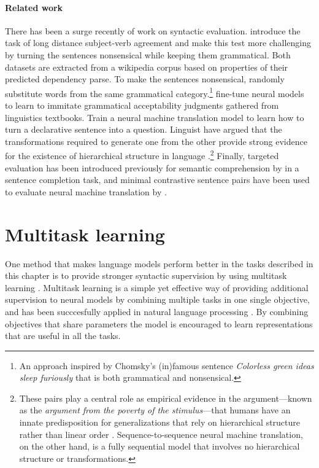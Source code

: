 \paragraph{Related work} There has been a surge recently of work on syntactic evaluation. \citet{linzen2016syntax} introduce the task of long distance subject-verb agreement and \citet{gulordava2018colorless} make this test more challenging by turning the sentences nonsensical while keeping them grammatical. Both datasets are extracted from a wikipedia corpus based on properties of their predicted dependency parse. To make the sentences nonsensical, \citet{gulordava2018colorless} randomly substitute words from the same grammatical category.\footnote{An approach inspired by Chomsky's (in)famous sentence \textit{Colorless green ideas sleep furiously} that is both grammatical and nonsensical.} \citet{warstadt2018acceptability} fine-tune neural models to learn to immitate grammatical acceptability judgments gathered from linguistics textbooks.
\citet{mccoy2018revisiting} Train a neural machine translation model to learn how to turn a declarative sentence into a question. Linguist have argued that the transformations required to generate one from the other provide strong evidence for the existence of hierarchical structure in language \cite{everaert2015structures}.\footnote{These pairs play a central role as empirical evidence in the argument---known as the \textit{argument from the poverty of the stimulus}---that humans have an innate predisposition for generalizations that rely on hierarchical structure rather than linear order \citep{chomsky1980rules}. Sequence-to-sequence neural machine translation, on the other hand, is a fully sequential model that involves no hierarchical structure or transformations.} Finally, targeted evaluation has been introduced previously for semantic comprehension by \citet{zweig2011microsoft} in a sentence completion task, and minimal contrastive sentence pairs have been used to evaluate neural machine translation by \citet{sennrich2017grammatical}.


\section{Multitask learning}
One method that makes language models perform better in the tasks described in this chapter is to provide stronger syntactic supervision by using multitask learning \citep{enguehard2017multitask,linzen2018targeted}. Multitask learning is a simple yet effective way of providing additional supervision to neural models by combining multiple tasks in one single objective, and has been succcesfully applied in natural language processing \cite{collobert2008unified,collobert2011natural,zhang2016multitask,goldberg2016multitask}. By combining objectives that share parameters the model is encouraged to learn representations that are useful in all the tasks.

